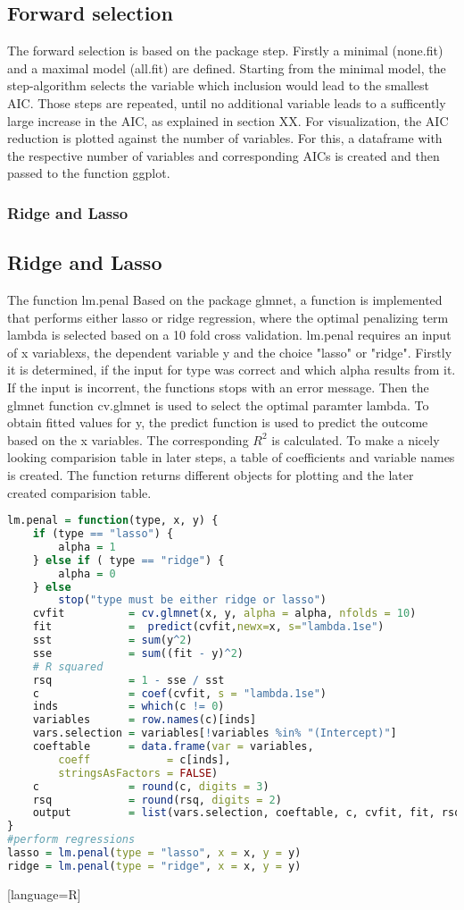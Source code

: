 \subsection{Forward selection}
The forward selection is based on the package step. Firstly a minimal (none.fit) and a maximal model (all.fit) are defined. Starting from the minimal model, the step-algorithm selects the variable which inclusion would lead to the smallest AIC. Those steps are repeated, until no additional variable leads to a sufficently large increase in the AIC, as explained in section XX. 
For visualization, the AIC reduction is plotted against the number of variables. For this, a dataframe with the respective number of variables and corresponding AICs is created and then passed to the function ggplot.

\subsubsection{Ridge and Lasso}
\subsection{Ridge and Lasso}
The function lm.penal Based on the package glmnet, a function is implemented  that performs either lasso or ridge regression, where the optimal penalizing term lambda is selected based on a 10 fold cross validation. lm.penal requires an input of x variablexs, the dependent variable y and the choice "lasso" or "ridge". Firstly it is determined, if the input for type was correct and which alpha results from it. If the input is incorrent, the functions stops with an error message.
Then the glmnet function cv.glmnet is used to select the optimal paramter lambda. To obtain fitted values for y,  the predict function is used  to predict the outcome based on the x variables. The corresponding $R^{2}$ is calculated.
To make a nicely looking comparision table in later steps, a table of coefficients and variable names is created. The function returns different objects for plotting and the later created comparision table.
\begin{lstlisting}[language=R]
lm.penal = function(type, x, y) {
    if (type == "lasso") {
        alpha = 1
    } else if ( type == "ridge") {
        alpha = 0
    } else
        stop("type must be either ridge or lasso")
    cvfit          = cv.glmnet(x, y, alpha = alpha, nfolds = 10)
    fit            =  predict(cvfit,newx=x, s="lambda.1se")
    sst            = sum(y^2)
    sse            = sum((fit - y)^2)
    # R squared
    rsq            = 1 - sse / sst
    c              = coef(cvfit, s = "lambda.1se")
    inds           = which(c != 0)
    variables      = row.names(c)[inds]
    vars.selection = variables[!variables %in% "(Intercept)"]
    coeftable      = data.frame(var = variables,
        coeff            = c[inds],
        stringsAsFactors = FALSE)
    c              = round(c, digits = 3)
    rsq            = round(rsq, digits = 2)
    output         = list(vars.selection, coeftable, c, cvfit, fit, rsq)
}
#perform regressions
lasso = lm.penal(type = "lasso", x = x, y = y)
ridge = lm.penal(type = "ridge", x = x, y = y)
\end{lstlisting}[language=R]

